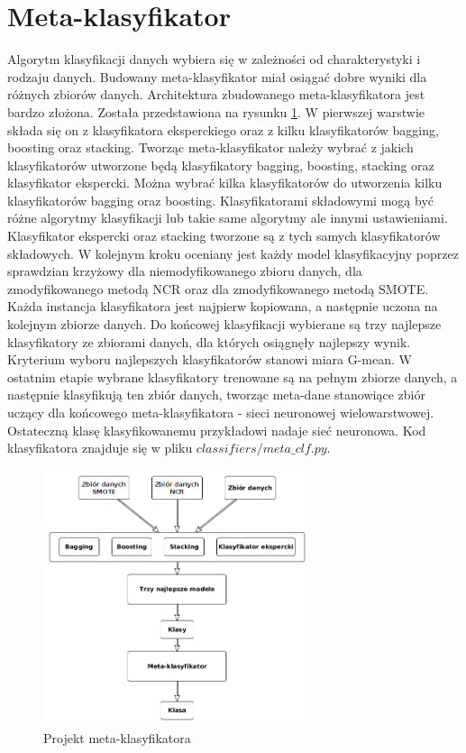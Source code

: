 \section{Meta-klasyfikator}
Algorytm klasyfikacji danych wybiera się w zależności od charakterystyki i rodzaju danych. Budowany meta-klasyfikator miał osiągać dobre wyniki dla różnych zbiorów danych. Architektura zbudowanego meta-klasyfikatora jest bardzo złożona. Została przedstawiona na rysunku \ref{fig:metaklasmoj}. W pierwszej warstwie składa się on z klasyfikatora eksperckiego oraz z kilku klasyfikatorów bagging, boosting oraz stacking. Tworząc meta-klasyfikator należy wybrać z jakich klasyfikatorów utworzone będą klasyfikatory bagging, boosting, stacking oraz klasyfikator ekspercki. Można wybrać kilka klasyfikatorów do utworzenia kilku klasyfikatorów bagging oraz boosting. Klasyfikatorami składowymi mogą być różne algorytmy klasyfikacji lub takie same algorytmy ale innymi ustawieniami. Klasyfikator ekspercki oraz stacking tworzone są z tych samych klasyfikatorów składowych. W kolejnym kroku oceniany jest każdy model klasyfikacyjny poprzez sprawdzian krzyżowy dla niemodyfikowanego zbioru danych, dla zmodyfikowanego metodą NCR oraz dla zmodyfikowanego metodą SMOTE. Każda instancja klasyfikatora jest najpierw kopiowana, a następnie uczona na kolejnym zbiorze danych. Do końcowej klasyfikacji wybierane są trzy najlepsze klasyfikatory ze zbiorami danych, dla których osiągnęły najlepszy wynik. Kryterium wyboru najlepszych klasyfikatorów stanowi miara G-mean. W ostatnim etapie wybrane klasyfikatory trenowane są na pełnym zbiorze danych, a następnie klasyfikują ten zbiór danych, tworząc meta-dane stanowiące zbiór uczący dla końcowego meta-klasyfikatora - sieci neuronowej wielowarstwowej. Ostateczną klasę klasyfikowanemu przykładowi nadaje sieć neuronowa. Kod klasyfikatora znajduje się w pliku $classifiers/meta\_clf.py$.
\begin{figure}[H]
	\centering
	\includegraphics[width=0.7\textwidth]{./images/metaklas.png}
	\caption{Projekt meta-klasyfikatora}
	\label{fig:metaklasmoj}
\end{figure}
